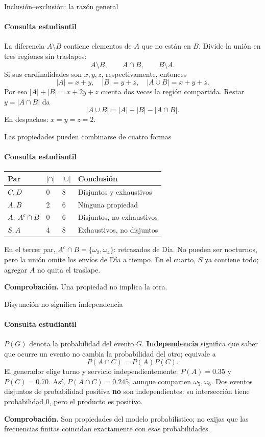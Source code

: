 \documentclass[aspectratio=169,11pt,spanish]{beamer}
\newcommand{\verifica}[1]{\par\smallskip\textbf{Comprobación.} #1\par}
\begin{document}
\begin{frame}{Inclusión--exclusión: la razón general}
\framesubtitle{Consulta estudiantil}
La diferencia $A\setminus B$ contiene elementos de $A$ que no están en $B$.
Divide la unión en tres regiones sin traslapes:
\[
A\setminus B,\qquad A\cap B,\qquad B\setminus A.
\]
Si sus cardinalidades son $x,y,z$, respectivamente, entonces
\[
|A|=x+y,\quad |B|=y+z,\quad |A\cup B|=x+y+z.
\]
Por eso $|A|+|B|=x+2y+z$ cuenta dos veces la región compartida.
Restar $y=|A\cap B|$ da
\[
\boxed{|A\cup B|=|A|+|B|-|A\cap B|}.
\]
En despachos: $x=y=z=2$.
\end{frame}

\begin{frame}{Las propiedades pueden combinarse de cuatro formas}
\framesubtitle{Consulta estudiantil}
\begin{tabular}{llll}
\toprule Par & $|\cap|$ & $|\cup|$ & Conclusión\\ \midrule
$C,D$ & 0 & 8 & Disjuntos y exhaustivos\\
$A,B$ & 2 & 6 & Ninguna propiedad\\
$A,\ A^c\cap B$ & 0 & 6 & Disjuntos, no exhaustivos\\
$S,A$ & 4 & 8 & Exhaustivos, no disjuntos\\ \bottomrule
\end{tabular}\par
\medskip
En el tercer par, $A^c\cap B=\{\omega_2,\omega_4\}$: retrasados de Día. No pueden ser nocturnos, pero la unión omite los envíos de Día a tiempo.
\medskip
En el cuarto, $S$ ya contiene todo; agregar $A$ no quita el traslape.
\verifica{Una propiedad no implica la otra.}
\end{frame}

\begin{frame}{Disyunción no significa independencia}
\framesubtitle{Consulta estudiantil}
$P(G)$ denota la probabilidad del evento $G$.
\textbf{Independencia} significa que saber que ocurre un evento no cambia la probabilidad del otro; equivale a
\[
P(A\cap C)=P(A)P(C).
\]
El generador elige turno y servicio independientemente: $P(A)=0.35$ y $P(C)=0.70$.
Así, $P(A\cap C)=0.245$, aunque comparten $\omega_5,\omega_6$.
\medskip
Dos eventos disjuntos de probabilidad positiva \textbf{no} son independientes:
su intersección tiene probabilidad 0, pero el producto es positivo.
\verifica{Son propiedades del modelo probabilístico; no exijas que las frecuencias finitas coincidan exactamente con esas probabilidades.}
\end{frame}
\end{document}
